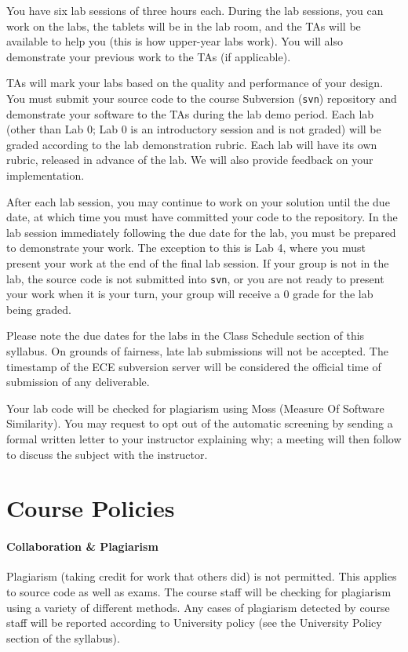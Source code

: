 \documentclass[letterpaper,10pt]{article}
\begin{document}
You have six lab sessions of three hours each. During the lab sessions, you can work on the labs, the tablets will be in the lab room, and the TAs will be available to help you (this is how upper-year labs work). You will also demonstrate your previous work to the TAs (if applicable).

TAs will mark your labs based on the quality and performance of your design. You must submit your source code to the course Subversion (\texttt{svn}) repository and demonstrate your software to the TAs during the lab demo period. Each lab (other than Lab 0; Lab 0 is an introductory session and is not graded) will be graded according to the lab demonstration rubric. Each lab will have its own rubric, released in advance of the lab. We will also provide feedback on your implementation.

After each lab session, you may continue to work on your solution until the due date, at which time you must have committed your code to the repository. In the lab session immediately following the due date for the lab, you must be prepared to demonstrate your work. The exception to this is Lab 4, where you must present your work at the end of the final lab session.  If your group is not in the lab, the source code is not submitted into \texttt{svn}, or you are not ready to present your work when it is your turn, your group will receive a 0 grade for the lab being graded.

Please note the due dates for the labs in the Class Schedule section of this syllabus. On grounds of fairness, late lab submissions will not be accepted. The timestamp of the ECE subversion server will be considered the official time of submission of any deliverable.

Your lab code will be checked for plagiarism using Moss (Measure Of Software Similarity). You may request to opt out of the automatic screening by sending a formal written letter to your instructor explaining why; a meeting will then follow to discuss the subject with the instructor.

\section*{Course Policies}

\paragraph{Collaboration \& Plagiarism}

Plagiarism (taking credit for work that others did) is not permitted. This applies to source code as well as exams. The course staff will be checking for plagiarism using a variety of different methods. Any cases of plagiarism detected by course staff will be reported according to University policy (see the University Policy section of the syllabus).
\end{document}
